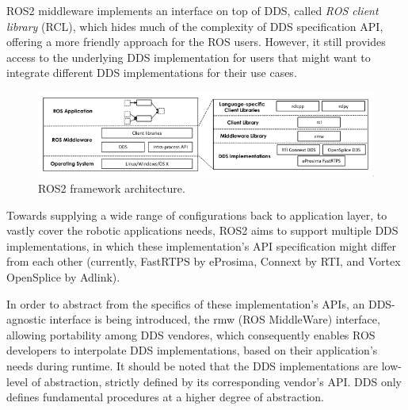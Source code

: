 ROS2 middleware implements an interface on top of DDS, called \textit{ROS client library} (RCL), which hides much of the complexity of DDS specification API, offering a more friendly approach for the ROS users. However, it still provides access to the underlying DDS implementation for users that might want to integrate different DDS implementations for their use cases.

\begin{figure}[H]
    \centering
    \includegraphics[width=\linewidth]{images/ros2-architecture.png}
    \caption{ROS2 framework architecture.}
    \label{fig:ros2-architecture}
\end{figure}

Towards supplying a wide range of configurations back to application layer, to vastly cover the robotic applications needs, ROS2 aims to support multiple DDS implementations, in which these implementation's API specification might differ from each other (currently, FastRTPS by eProsima, Connext by RTI, and Vortex OpenSplice by Adlink). 

In order to abstract from the specifics of these implementation's APIs, an DDS-agnostic interface is being introduced, the rmw (ROS MiddleWare) interface, allowing portability among DDS vendores, which consequently enables ROS developers to interpolate DDS implementations, based on their application's needs during runtime. It should be noted that the DDS implementations are low-level of abstraction, strictly defined by its corresponding vendor's API. DDS only defines fundamental procedures at a higher degree of abstraction.  


